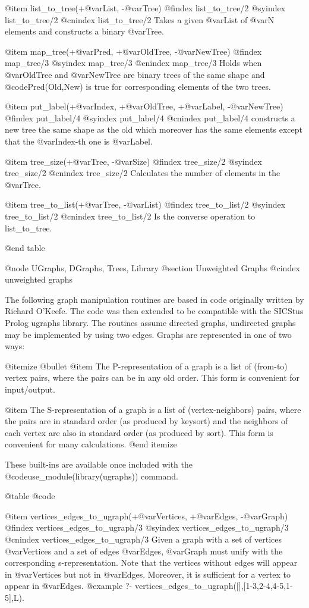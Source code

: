 {{{{{{{{@item list_to_tree(+@var{List}, -@var{Tree})
@findex list_to_tree/2
@syindex list_to_tree/2
@cnindex list_to_tree/2
Takes a given @var{List} of @var{N} elements and constructs a binary
@var{Tree}.

@item map_tree(+@var{Pred}, +@var{OldTree}, -@var{NewTree})
@findex map_tree/3
@syindex map_tree/3
@cnindex map_tree/3
Holds when @var{OldTree} and @var{NewTree} are binary trees of the same shape
and @code{Pred(Old,New)} is true for corresponding elements of the two trees.

@item put_label(+@var{Index}, +@var{OldTree}, +@var{Label}, -@var{NewTree})
@findex put_label/4
@syindex put_label/4
@cnindex put_label/4
constructs a new tree the same shape as the old which moreover has the
same elements except that the @var{Index}-th one is @var{Label}.

@item tree_size(+@var{Tree}, -@var{Size})
@findex tree_size/2
@syindex tree_size/2
@cnindex tree_size/2
Calculates the number of elements in the @var{Tree}.

@item tree_to_list(+@var{Tree}, -@var{List})
@findex tree_to_list/2
@syindex tree_to_list/2
@cnindex tree_to_list/2
Is the converse operation to list_to_tree.

@end table

@node UGraphs, DGraphs, Trees, Library
@section Unweighted Graphs
@cindex unweighted graphs

The following graph manipulation routines are based in code originally
written by Richard O'Keefe. The code was then extended to be compatible
with the SICStus Prolog ugraphs library. The routines assume directed
graphs, undirected graphs may be implemented by using two edges. Graphs
are represented in one of two ways:

@itemize @bullet
@item The P-representation of a graph is a list of (from-to) vertex
pairs, where the pairs can be in any old order.  This form is
convenient for input/output.
 
@item The S-representation of a graph is a list of (vertex-neighbors)
pairs, where the pairs are in standard order (as produced by keysort)
and the neighbors of each vertex are also in standard order (as
produced by sort).  This form is convenient for many calculations.
@end itemize

These built-ins are available once included with the
@code{use_module(library(ugraphs))} command.

@table @code

@item vertices_edges_to_ugraph(+@var{Vertices}, +@var{Edges}, -@var{Graph})
@findex  vertices_edges_to_ugraph/3
@syindex vertices_edges_to_ugraph/3
@cnindex vertices_edges_to_ugraph/3
Given a graph with a set of vertices @var{Vertices} and a set of edges
@var{Edges}, @var{Graph} must unify with the corresponding
s-representation. Note that the vertices without edges will appear in
@var{Vertices} but not in @var{Edges}. Moreover, it is sufficient for a
vertex to appear in @var{Edges}.
@example
?- vertices_edges_to_ugraph([],[1-3,2-4,4-5,1-5],L).

}}}}}}}}
